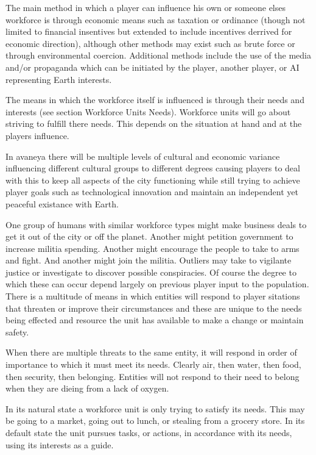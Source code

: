 The main method in which a player can influence his own or someone elses workforce is through economic means such as taxation or ordinance (though not limited to financial insentives but extended to include incentives derrived for economic direction), although other methods may exist such as brute force or through environmental coercion. Additional methods include the use of the media and/or propaganda which can be initiated by the player, another player, or AI representing Earth interests.

The means in which the workforce itself is influenced is through their needs and interests (see section Workforce Units Needs). Workforce units will go about striving to fulfill there needs. This depends on the situation at hand and at the players influence.

In avaneya there will be multiple levels of cultural and economic variance influencing different cultural groups to different degrees causing players to deal with this to keep all aspects of the city functioning while still trying to achieve player goals such as technological innovation and maintain an independent yet peaceful existance with Earth.

One group of humans with similar workforce types might make business deals to get it out of the city or off the planet. Another might petition government to increase militia spending. Another might encourage the people to take to arms and fight. And another might join the militia. Outliers may take to vigilante justice or investigate to discover possible conspiracies. Of course the degree to which these can occur depend largely on previous player input to the population. There is a multitude of means in which entities will respond to player sitations that threaten or improve their circumstances and these are unique to the needs being effected and resource the unit has available to make a change or maintain safety.

When there are multiple threats to the same entity, it will respond in order of importance to which it must meet its needs. Clearly air, then water, then food, then security, then belonging. Entities will not respond to their need to belong when they are dieing from a lack of oxygen.

In its natural state a workforce unit is only trying to satisfy its needs. This may be going to a market, going out to lunch, or stealing from a grocery store. In its default state the unit pursues tasks, or actions, in accordance with its needs, using its interests as a guide.

